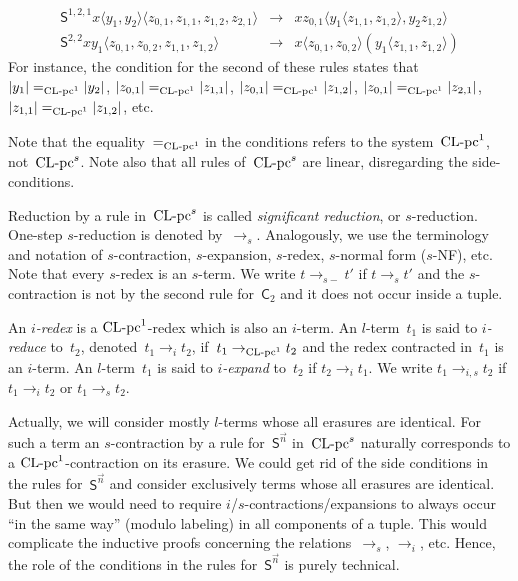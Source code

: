 \documentclass[a4paper,UKenglish]{lipics-v2016}
\newcommand{\Cs}{\mathsf{C}}
\newcommand{\Ss}{\mathsf{S}}
\newcommand{\erase}[1]{\ensuremath{|#1|}}
\newcommand{\la}{\ensuremath{\langle}}
\newcommand{\ra}{\ensuremath{\rangle}}
\newcommand{\CLC}{{\mbox{${\text{\rm CL-pc}^1}$}}}
\newcommand{\sCLC}{{\ensuremath{\text{\rm CL-pc}^1}}}
\newcommand{\CLCs}{{\mbox{${\text{\rm CL-pc}^s}$}}}
\begin{document}
\begin{definition}
\[\begin{array}{rcl}
      \Ss^{1,2,1} x \la y_1, y_2 \ra \la z_{0,1}, z_{1,1}, z_{1,2},
      z_{2,1}\ra &\to& x z_{0,1} \la y_1 \la z_{1,1}, z_{1,2} \ra, y_2
                       z_{1,2}\ra \\
      \Ss^{2,2} x y_1 \la z_{0,1}, z_{0,2}, z_{1,1}, z_{1,2}\ra &\to& x\la z_{0,1}, z_{0,2}
                                                                      \ra
                                                                      (y_1
                                                                      \la
                                                                      z_{1,1},
                                                                      z_{1,2}
                                                                      \ra)
    \end{array}
  \]
  For instance, the condition for the second of these rules states
  that $\erase{y_1} =_{\sCLC} \erase{y_2}$,
  $\erase{z_{0,1}} =_{\sCLC} \erase{z_{1,1}}$,
  $\erase{z_{0,1}} =_{\sCLC} \erase{z_{1,2}}$,
  $\erase{z_{0,1}} =_{\sCLC} \erase{z_{2,1}}$, $\erase{z_{1,1}}
  =_{\sCLC} \erase{z_{1,2}}$, etc.

  Note that the equality~$=_\sCLC$ in the conditions refers to the
  system~$\CLC$, not~$\CLCs$. Note also that all rules of~$\CLCs$ are
  linear, disregarding the side-conditions.

  Reduction by a rule in~$\CLCs$ is called \emph{significant
    reduction}, or $s$-reduction. One-step $s$-reduction is denoted
  by~$\to_s$. Analogously, we use the terminology and notation of
  $s$-contraction, $s$-expansion, $s$-redex, $s$-normal form ($s$-NF),
  etc. Note that every $s$-redex is an $s$-term. We write
  $t \to_{s{-}} t'$ if $t \to_s t'$ and the $s$-contraction is not by
  the second rule for~$\Cs_2$ and it does not occur inside a tuple.

  An \emph{$i$-redex} is a $\CLC$-redex which is also an $i$-term. An
  $l$-term~$t_1$ is said to \emph{$i$-reduce} to~$t_2$,
  denoted~$t_1 \to_i t_2$, if~$t_1 \to_\sCLC t_2$ and the redex
  contracted in~$t_1$ is an $i$-term. An $l$-term~$t_1$ is said to
  \emph{$i$-expand} to~$t_2$ if $t_2 \to_i t_1$. We write
  $t_1 \to_{i,s} t_2$ if $t_1 \to_i t_2$ or $t_1 \to_s t_2$.
\end{definition}

Actually, we will consider mostly $l$-terms whose all erasures are
identical. For such a term an $s$-contraction by a rule
for~$\Ss^{\vec{n}}$ in~$\CLCs$ naturally corresponds to a
$\CLC$-contraction on its erasure. We could get rid of the side
conditions in the rules for~$\Ss^{\vec{n}}$ and consider exclusively
terms whose all erasures are identical. But then we would need to
require $i$/$s$-contractions/expansions to always occur ``in the same
way'' (modulo labeling) in all components of a tuple. This would
complicate the inductive proofs concerning the relations~$\to_s$,
$\to_i$, etc. Hence, the role of the conditions in the rules
for~$\Ss^{\vec{n}}$ is purely technical.
\end{document}
